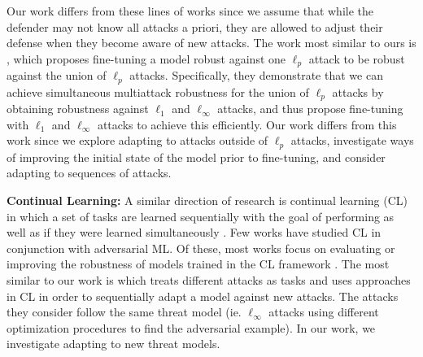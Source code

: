 Our work differs from these lines of works since we assume that while the defender may not know all attacks a priori, they are allowed to adjust their defense when they become aware of new attacks.  The work most similar to ours is \citet{croce2022adversarial}, which proposes fine-tuning a model robust against one $\ell_p$ attack to be robust against the union of $\ell_p$ attacks.  Specifically, they demonstrate that we can achieve simultaneous multiattack robustness for the union of $\ell_p$ attacks by obtaining robustness against $\ell_1$ and $\ell_{\infty}$ attacks, and thus propose fine-tuning with $\ell_1$ and $\ell_{\infty}$ attacks to achieve this efficiently.  Our work differs from this work since we explore adapting to attacks outside of $\ell_p$ attacks, investigate ways of improving the initial state of the model prior to fine-tuning, and consider adapting to sequences of attacks.

\textbf{Continual Learning:} A similar direction of research is continual learning (CL) in which a set of tasks are learned sequentially with the goal of performing as well as if they were learned simultaneously \citep{wang2023comprehensive}.  Few works have studied CL in conjunction with adversarial ML.  Of these, most works focus on evaluating or improving the robustness of models trained in the CL framework \citep{bai2023towards,9892970, khan2022susceptibility}. The most similar to our work is \citet{wang2023continual} which treats different attacks as tasks and uses approaches in CL in order to sequentially adapt a model against new attacks.  The attacks they consider follow the same threat model (ie. $\ell_{\infty}$ attacks using different optimization procedures to find the adversarial example).  In our work, we investigate adapting to new threat models.

